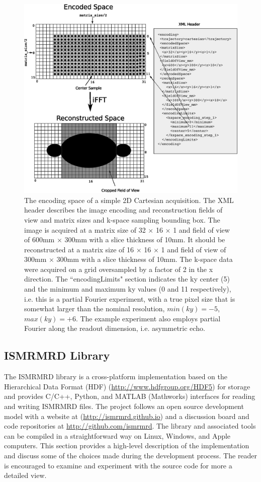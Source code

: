 \documentclass[12pt]{article}
\begin{document}
\begin{figure}
\begin{center}
\includegraphics[width=6in]{figure3_encoding_spaces.eps}
\caption{The encoding space of a simple 2D Cartesian acquisition.  The XML header describes the image encoding and reconstruction fields of view and matrix sizes and k-space sampling bounding box.  The image is acquired at a matrix size of 32 $\times$ 16 $\times$ 1 and field of view of 600mm $\times$ 300mm with a slice thickness of 10mm.  It should be reconstructed at a matrix size of 16 $\times$ 16 $\times$ 1 and field of view of 300mm $\times$ 300mm with a slice thickness of 10mm.   The k-space data were acquired on a grid oversampled by a factor of 2 in the x direction.  The ``encodingLimits" section indicates the ky center (5) and the minimum and maximum ky values (0 and 11 respectively), i.e. this is a partial Fourier experiment, with a true pixel size that is somewhat larger than the nominal resolution, $min(ky)=-5$, $max(ky)=+6$. The example experiment also employs partial Fourier along the readout dimension, i.e. asymmetric echo.}
\label{fig:encoding}
\end{center}
\end{figure}


\subsection*{ISMRMRD Library}
The ISMRMRD library is a cross-platform implementation based on the Hierarchical Data Format (HDF) (\url{http://www.hdfgroup.org/HDF5}) for storage and provides C/C++, Python, and MATLAB (Mathworks) interfaces for reading and writing ISMRMRD files.  The project follows an open source development model with a website at (\url{http://ismrmrd.github.io}) and a discussion board and code repositories at \url{http://github.com/ismrmrd}.  The library and associated tools can be compiled in a straightforward way on Linux, Windows, and Apple computers.  This section provides a high-level description of the implementation and discuss some of the choices made during the development process.  The reader is encouraged to examine and experiment with the source code for more a detailed view.
\end{document}

